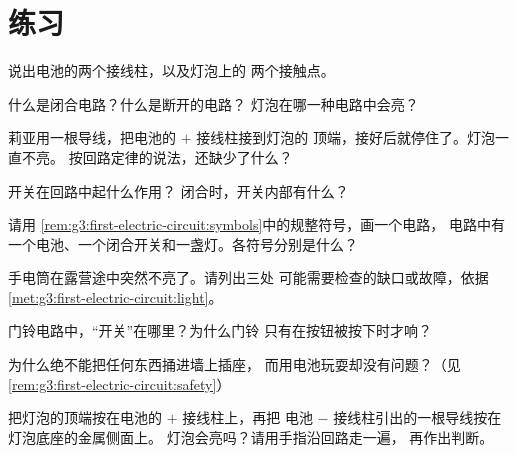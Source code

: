 \section{练习}

\begin{exercise}[$\star$]\label{exo:g3:first-electric-circuit:1}
说出电池的两个接线柱，以及灯泡上的
两个接触点。
\end{exercise}

\begin{exercise}[$\star$]\label{exo:g3:first-electric-circuit:2}
什么是闭合电路？什么是断开的电路？
灯泡在哪一种电路中会亮？
\end{exercise}

\begin{exercise}[$\star$]\label{exo:g3:first-electric-circuit:3}
莉亚用一根导线，把电池的 $+$ 接线柱接到灯泡的
顶端，接好后就停住了。灯泡一直不亮。
按回路定律的说法，还缺少了什么？
\end{exercise}

\begin{exercise}[$\star$]\label{exo:g3:first-electric-circuit:4}
开关在回路中起什么作用？
闭合时，开关内部有什么？
\end{exercise}

\begin{exercise}[$\star$]\label{exo:g3:first-electric-circuit:5}
请用
\cref{rem:g3:first-electric-circuit:symbols}中的规整符号，画一个电路，
电路中有一个电池、一个闭合开关和一盏灯。各符号分别是什么？
\end{exercise}

\begin{exercise}[$\star$]\label{exo:g3:first-electric-circuit:6}
手电筒在露营途中突然不亮了。请列出三处
可能需要检查的缺口或故障，依据
\cref{met:g3:first-electric-circuit:light}。
\end{exercise}

\begin{exercise}[$\star$]\label{exo:g3:first-electric-circuit:7}
门铃电路中，“开关”在哪里？为什么门铃
只有在按钮被按下时才响？
\end{exercise}

\begin{exercise}[$\star$]\label{exo:g3:first-electric-circuit:8}
为什么绝不能把任何东西捅进墙上插座，
而用电池玩耍却没有问题？（见
\cref{rem:g3:first-electric-circuit:safety}）
\end{exercise}

\begin{exercise}[$\star$]\label{exo:g3:first-electric-circuit:9}
把灯泡的顶端按在电池的 $+$ 接线柱上，再把
电池 $-$ 接线柱引出的一根导线按在灯泡底座的金属侧面上。
灯泡会亮吗？请用手指沿回路走一遍，
再作出判断。
\end{exercise}

